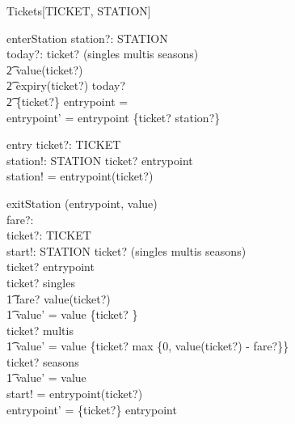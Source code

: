 \documentclass[11pt]{article}
\begin{document}
\begin{class}{Tickets[TICKET, STATION]}
\begin{op}{enterStation}
station?: STATION \\ 
today?:  \nat  
\where
 ticket? \in (singles \cup multis \cup seasons) \land \\ 
\t2 value(ticket?)  \land \\ 
\t2 expiry(ticket?) \geq today? \land \\ 
\t2 \{ticket?\} \dres entrypoint = \emptyset \\ 
entrypoint' = entrypoint \cup \{ticket? \mapsto station?\} \\ 
\end{op} \classbreak 
\begin{op}{entry}
ticket?: TICKET \\ 
station!: STATION 
\where
 ticket? \in  \dom entrypoint \\ 
station! = entrypoint(ticket?) \\ 
\end{op} \classbreak 
\begin{op}{exitStation}
\Delta (entrypoint, value)\\
fare?:  \nat  \\ 
ticket?: TICKET \\ 
start!: STATION 
\where
 ticket? \in (singles \cup multis \cup seasons) \land \\ 
ticket? \in  \dom entrypoint \\ 
ticket? \in singles \implies\\
\t1 fare? \leq value(ticket?) \land \\ 
\t1 value' = value \oplus \{ticket? \}\\
ticket? \in multis \implies\\ 
\t1 value' = value \oplus \{ticket? \mapsto max \{0, value(ticket?) - fare?\}\}\\ 
ticket? \in seasons \implies\\
\t1 value' = value\\
start! = entrypoint(ticket?) \\ 
entrypoint' = \{ticket?\} \ndres entrypoint
\end{op} 
\end{class} 
\end{document}
